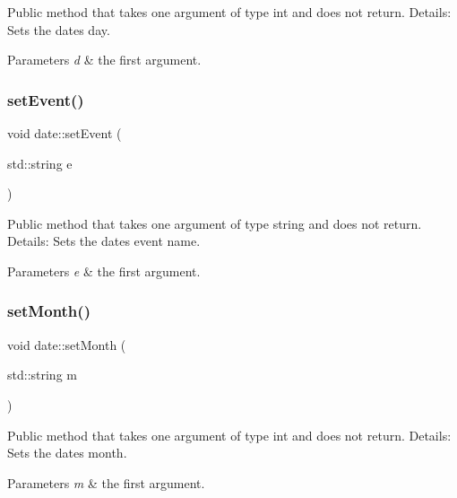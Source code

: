 Public method that takes one argument of type int and does not return. Details\+: Sets the date\textquotesingle{}s day. 
\begin{DoxyParams}{Parameters}
{\em d} & the first argument. \\
\hline
\end{DoxyParams}
\mbox{\label{classdate_aa0fe205a0a19cc07929a466ae3be467a}} 
\subsubsection{\texorpdfstring{set\+Event()}{setEvent()}}
{\footnotesize\ttfamily void date\+::set\+Event (\begin{DoxyParamCaption}\item[{std\+::string}]{e }\end{DoxyParamCaption})}

Public method that takes one argument of type string and does not return. Details\+: Sets the date\textquotesingle{}s event name. 
\begin{DoxyParams}{Parameters}
{\em e} & the first argument. \\
\hline
\end{DoxyParams}
\mbox{\label{classdate_a8670c70e6b4164ec3be0b14f53ff0205}} 
\subsubsection{\texorpdfstring{set\+Month()}{setMonth()}}
{\footnotesize\ttfamily void date\+::set\+Month (\begin{DoxyParamCaption}\item[{std\+::string}]{m }\end{DoxyParamCaption})}

Public method that takes one argument of type int and does not return. Details\+: Sets the date\textquotesingle{}s month. 
\begin{DoxyParams}{Parameters}
{\em m} & the first argument. \\
\hline
\end{DoxyParams}
\mbox{\label{classdate_a6775df9799798629ef0c899030885235}} 
